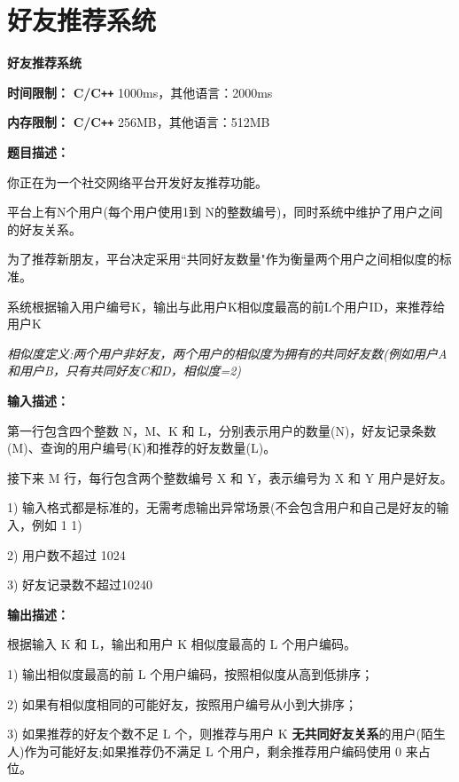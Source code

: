 \documentclass[a4paper]{ctexart}
\begin{document}
\newpage
	
\section{好友推荐系统}
	
\begin{center}
	\Large \textbf{好友推荐系统}
\end{center}
	
\noindent\textbf{时间限制：} \textbf{C/C\texttt{++}} 1000ms，其他语言：2000ms
	
\noindent\textbf{内存限制：} \textbf{C/C\texttt{++}} 256MB，其他语言：512MB
	
\vspace{10pt}
	
\noindent\textbf{题目描述：}
	
你正在为一个社交网络平台开发好友推荐功能。

平台上有N个用户(每个用户使用1到 N的整数编号)，同时系统中维护了用户之间的好友关系。

为了推荐新朋友，平台决定采用“共同好友数量"作为衡量两个用户之间相似度的标准。

系统根据输入用户编号K，输出与此用户K相似度最高的前L个用户ID，来推荐给用户K

\textit{相似度定义:两个用户非好友，两个用户的相似度为拥有的共同好友数(例如用户A和用户B，只有共同好友C和D，相似度=2)}
	
\noindent\textbf{输入描述：}
	
第一行包含四个整数 N，M、K 和 L，分别表示用户的数量(N)，好友记录条数(M)、查询的用户编号(K)和推荐的好友数量(L)。
	
接下来 M 行，每行包含两个整数编号 X 和 Y，表示编号为 X 和 Y 用户是好友。

1) 输入格式都是标准的，无需考虑输出异常场景(不会包含用户和自己是好友的输入，例如 1 1)

2) 用户数不超过 1024

3) 好友记录数不超过10240
	
\noindent\textbf{输出描述：} 
	
根据输入 K 和 L，输出和用户 K 相似度最高的 L 个用户编码。

1) 输出相似度最高的前 L 个用户编码，按照相似度从高到低排序；

2) 如果有相似度相同的可能好友，按照用户编号从小到大排序；

3) 如果推荐的好友个数不足 L 个，则推荐与用户 K \textbf{无共同好友关系}的用户(陌生人)作为可能好友;如果推荐仍不满足 L 个用户，剩余推荐用户编码使用 0 来占位。
	
\end{document}
